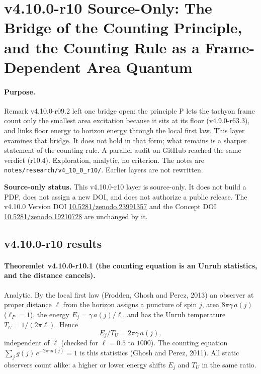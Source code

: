 \clearpage
\section*{v4.10.0-r10 Source-Only: The Bridge of the Counting Principle, and the Counting Rule as a Frame-Dependent Area Quantum}
\label{sec:v4100-r10-area-quantum}

\paragraph{Purpose.}
Remark v4.10.0-r09.2 left one bridge open: the principle P lets the tachyon frame count only the smallest area excitation because it sits at its
floor (v4.9.0-r63.3), and links floor energy to horizon energy through the local first law.  This layer examines that bridge.  It does not hold in
that form; what remains is a sharper statement of the counting rule.  A parallel audit on GitHub reached the same verdict (r10.4).  Exploration, analytic, no criterion.  The notes are
\texttt{notes/\allowbreak research/\allowbreak v4\_10\_0\_r10/}.  Earlier layers are not rewritten.

\noindent\textbf{Source-only status.}
This v4.10.0-r10 layer is source-only.  It does not build a PDF, does not assign a new DOI,
and does not authorize a public release.  The v4.10.0 Version DOI
\href{https://doi.org/10.5281/zenodo.23991357}{10.5281/zenodo.23991357} and the Concept DOI
\href{https://doi.org/10.5281/zenodo.19210728}{10.5281/zenodo.19210728} are unchanged by it.

\subsection*{v4.10.0-r10 results}
\label{subsec:v4100-r10-results}

\paragraph{Theoremlet v4.10.0-r10.1 (the counting equation is an Unruh statistics, and the distance cancels).}
Analytic.  By the local first law (Frodden, Ghosh and Perez, 2013) an observer at proper distance \(\ell\) from the horizon assigns a puncture of spin
\(j\), area \(8\pi\gamma\,a(j)\) (\(\ell_P=1\)), the energy \(E_j=\gamma\,a(j)/\ell\), and has the Unruh temperature \(T_U=1/(2\pi\ell)\).  Hence
\[
E_j/T_U=2\pi\gamma\,a(j),
\]
independent of \(\ell\) (checked for \(\ell=0.5\) to \(1000\)).  The counting equation \(\sum_j g(j)\,e^{-2\pi\gamma a(j)}=1\) is this statistics (Ghosh and
Perez, 2011).  All static observers count alike: a higher or lower energy shifts \(E_j\) and \(T_U\) in the same ratio.

